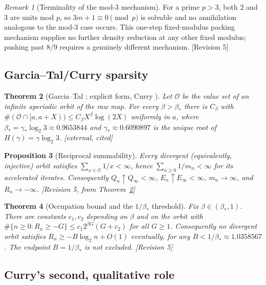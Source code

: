 \documentclass[11pt]{article}
\theoremstyle{plain}
\newtheorem{theorem}{Theorem}[section]
\newtheorem{proposition}[theorem]{Proposition}
\theoremstyle{definition}
\theoremstyle{remark}
\newtheorem{remark}[theorem]{Remark}
\newcommand{\Occ}{\mathcal{O}}
\newcommand{\status}[1]{\textsf{\footnotesize[#1]}}
\begin{document}
\begin{remark}[Terminality of the mod-$3$ mechanism]\label{rem:terminal}
For a prime $p>3$, both $2$ and $3$ are units mod $p$, so $3m+1\equiv0\pmod p$ is solvable and no
annihilation analogous to the mod-$3$ case occurs. This one-step fixed-modulus packing mechanism
supplies no further density reduction at any other fixed modulus; pushing past $8/9$ requires a
genuinely different mechanism. \status{Revision 5}
\end{remark}

\subsection{Garcia--Tal/Curry sparsity}

\begin{theorem}[Garcia--Tal \cite{GarciaTal}; explicit form, Curry \cite{Curry}]\label{thm:GTC}
Let $\Occ$ be the value set of an infinite aperiodic orbit of the raw map. For every
$\beta>\beta_*$ there is $C_\beta$ with
$\#(\Occ\cap[a,a+X))\le C_\beta X^\beta\log(2X)$ uniformly in $a$, where
$\beta_*=\gamma_*\log_2 3\approx0.9653844$ and $\gamma_*\approx0.6090897$ is the unique root of
$H(\gamma)=\gamma\log_2 3$. \status{external, cited}
\end{theorem}

\begin{proposition}[Reciprocal summability]\label{prop:recip}
Every divergent (equivalently, injective) orbit satisfies $\sum_{x\in\Occ}1/x<\infty$, hence
$\sum_{n\ge0}1/m_n<\infty$ for its accelerated iterates. Consequently $Q_n\uparrow Q_\infty<\infty$,
$E_n\uparrow E_\infty<\infty$, $m_n\to\infty$, and $R_n\to-\infty$. \status{Revision 5, from
Theorem~\ref{thm:GTC}}
\end{proposition}

\begin{theorem}[Occupation bound and the $1/\beta_*$ threshold]\label{thm:betastar}
Fix $\beta\in(\beta_*,1)$. There are constants $c_1,c_2$ depending on $\beta$ and on the orbit with
$\#\{n\ge0:R_n\ge-G\}\le c_1 2^{\beta G}(G+c_2)$ for all $G\ge1$. Consequently no divergent orbit
satisfies $R_n\ge-B\log_2 n+O(1)$ eventually, for any $B<1/\beta_*\approx1.0358567$. The endpoint
$B=1/\beta_*$ is not excluded. \status{Revision 5}
\end{theorem}

\subsection{Curry's second, qualitative role}\label{sec:curryqual}
\end{document}
